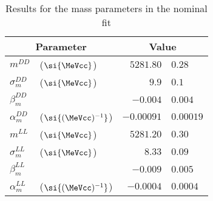 \begin{table}
  \caption{Results for the mass parameters in the nominal fit}
  \label{tab:app:measurement_of_sin2beta:cpv_measurement:results:mass}
  \centering
  \begin{tabular}{llr@{$\,\pm\,$}l}
      \toprule
      \multicolumn{2}{c}{Parameter}                                & \multicolumn{2}{c}{Value}  \\
      \midrule
      $m^{DD}_{}$              & ($\si{\MeVcc}$)        & $5281.80$    & $0.28$        \\
      $\sigma^{DD}_{m}$        & ($\si{\MeVcc}$)        & $9.9$        & $0.1$        \\
      $\beta^{DD}_{m}$         &                        & $-0.004$     & $0.004$     \\
      $\alpha^{DD}_{m}$        & ($\si{(\MeVcc)^{-1}}$) & $-0.00091$   & $0.00019$     \\
      \midrule
      $m^{LL}_{}$              & ($\si{\MeVcc}$)        & $5281.20$    & $0.30$        \\
      $\sigma^{LL}_{m}$        & ($\si{\MeVcc}$)        & $8.33$       & $0.09$        \\
      $\beta^{LL}_{m}$         &                        & $-0.009$     & $0.005$     \\
      $\alpha^{LL}_{m}$        & ($\si{(\MeVcc)^{-1}}$) & $-0.0004$    & $0.0004$      \\
      \bottomrule
    \end{tabular}
\end{table}
%

